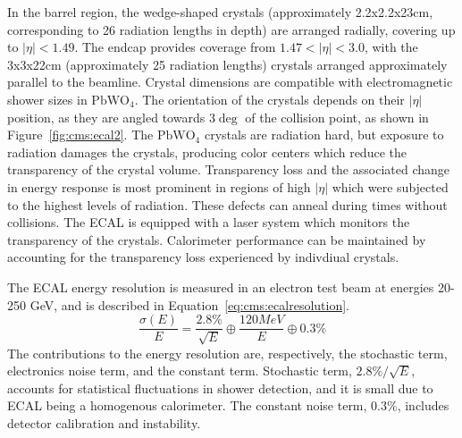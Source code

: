 In the barrel region, the wedge-shaped crystals (approximately 2.2x2.2x23cm, corresponding to 26 radiation lengths in depth) are arranged radially, covering up to $|\eta|<1.49$. The endcap provides coverage from $1.47<|\eta|<3.0$, with the 3x3x22cm (approximately 25 radiation lengths)  crystals arranged approximately parallel to the beamline. Crystal dimensions are compatible with electromagnetic shower sizes in $\mathrm{PbWO_4}$. The orientation of the crystals depends on their $|\eta|$ position, as they are angled towards $3\deg$ of the collision point, as shown in Figure~\ref{fig:cms:ecal2}.
 The $\mathrm{PbWO_4}$ crystals are radiation hard, but exposure to radiation damages the crystals, producing color centers which reduce the transparency of the crystal volume. Transparency loss and the associated change in energy response is most prominent in regions of high $|\eta|$ which were subjected to the highest levels of radiation\cite{Cipriani:2018ule}. These defects can anneal during times without collisions. The ECAL is equipped with a laser system which monitors the transparency of the crystals. Calorimeter performance can be maintained by accounting for the transparency loss experienced by indivdiual crystals\cite{CERN-LHCC-97-033}.   

The ECAL energy resolution is measured in an electron test beam at energies 20-250 GeV, and is described in Equation~\ref{eq:cms:ecalresolution}. 
\begin{equation}
\frac{\sigma(E)}{E}=\frac{2.8\%}{\sqrt{E}} \oplus \frac{120 MeV}{E} \oplus 0.3\%
\label{eq:cms:ecalresolution}
\end{equation}
The contributions to the energy resolution are, respectively, the stochastic term, electronics noise term, and the constant term. Stochastic term, $2.8\%/\sqrt{E}$, accounts for statistical fluctuations in shower detection, and it is small due to ECAL being a homogenous calorimeter. The constant noise term, $0.3\%$, includes detector calibration and instability\cite{Adzic:2007mi}.
